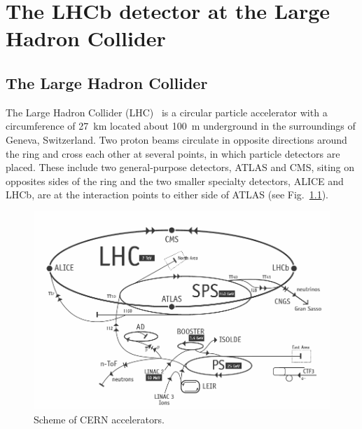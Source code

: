 \chapter{The LHCb detector at the Large Hadron Collider}
\label{ch:detector}

\section{The Large Hadron Collider}

The Large Hadron Collider (LHC)~\cite{Evans:2009zzc} is a circular particle accelerator with a circumference of 27~km located about 100~m underground
in the surroundings of Geneva, Switzerland. Two proton beams circulate in opposite directions around the ring and cross each
other at several points, in which particle detectors are placed. These include two general-purpose detectors, ATLAS and CMS,
siting on opposites sides of the ring and the two smaller specialty detectors, ALICE and LHCb, are at the interaction points
to either side of ATLAS (see Fig.~\ref{fig:lhc}).

\begin{figure}[h!]
\centering
\includegraphics[width=1\textwidth]{Detector/figs/LHC_scheme.png}
\caption{Scheme of CERN accelerators.} 
\label{fig:lhc}
\end{figure}

